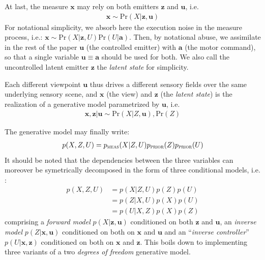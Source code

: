 \documentclass[12pt,twoside,openright]{article}
\begin{document}
At last, the measure $\boldsymbol{x}$ may rely on both emitters $\boldsymbol{z}$ and $\boldsymbol{u}$, i.e. 
\begin{align}
\boldsymbol{x} \sim \text{Pr}(X|\boldsymbol{z}, \boldsymbol{u})
\end{align} 
For notational simplicity, we absorb here the execution noise \cite{van2004role} in the measure process, i.e.:
$\boldsymbol{x} \sim \text{Pr}(X|\boldsymbol{z}, U)\text{Pr}(U|\boldsymbol{a})$.
Then, by notational abuse, we assimilate in the rest of the paper  $\boldsymbol{u}$ (the controlled emitter) with $\boldsymbol{a}$ (the motor command), so that 
a single variable $\boldsymbol{u} \equiv \boldsymbol{a}$ should be used for both. We also call the uncontrolled latent emitter $\boldsymbol{z}$ the \emph{latent state} for simplicity.

Each different viewpoint $\boldsymbol{u}$ thus drives a different sensory fields over the same underlying sensory scene, and $\boldsymbol{x}$ (the view) and $\boldsymbol{z}$ (the \emph{latent state}) is the realization of a generative model parametrized by $\boldsymbol{u}$, i.e.
\begin{align}
\boldsymbol{x}, \boldsymbol{z} | \boldsymbol{u} \sim \text{Pr}(X|Z, \boldsymbol{u}), \text{Pr}(Z)
\end{align}  

The generative model may finally write:
\begin{align}
p(X, Z, U) = p_\text{\sc meas}(X| Z, U)p_\text{\sc prior}(Z) p_\text{\sc prior}(U)
\end{align}
It should be noted that the dependencies between the three variables can moreover be symetrically decomposed in the form of three conditional models, i.e. :
\begin{align}
p(X, Z, U) &= p(X| Z, U) p(Z)p(U)\nonumber\\ 
&= p(Z| X, U)p(X) p(U)\nonumber\\
&= p(U|X, Z)p(X) p(Z)\label{eq:three-party}
\end{align}
comprising a \emph{forward model} $p(X|\boldsymbol{z}, \boldsymbol{u})$ 
conditioned on both $\boldsymbol{z}$ and $\boldsymbol{u}$,  an \emph{inverse model} $p(Z|\boldsymbol{x}, \boldsymbol{u})$  conditioned on both on  $\boldsymbol{x}$ and $\boldsymbol{u}$ and an ``\emph{inverse controller}'' $p(U|\boldsymbol{x}, \boldsymbol{z})$ conditioned on both on  $\boldsymbol{x}$ and $\boldsymbol{z}$. This boils down to implementing three variants of a two \emph{degrees of freedom} generative model. 
\end{document}
